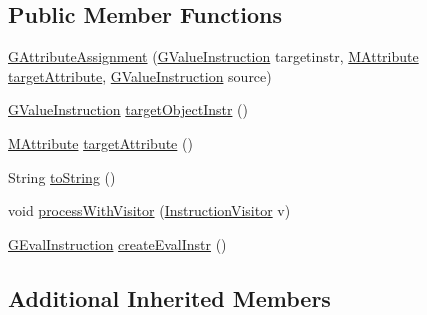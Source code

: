 \subsection*{Public Member Functions}
\begin{DoxyCompactItemize}
\item 
\hyperlink{classorg_1_1tzi_1_1use_1_1gen_1_1assl_1_1statics_1_1_g_attribute_assignment_af81b170b85bd59f32500a83f395dd5cf}{G\-Attribute\-Assignment} (\hyperlink{interfaceorg_1_1tzi_1_1use_1_1gen_1_1assl_1_1statics_1_1_g_value_instruction}{G\-Value\-Instruction} targetinstr, \hyperlink{classorg_1_1tzi_1_1use_1_1uml_1_1mm_1_1_m_attribute}{M\-Attribute} \hyperlink{classorg_1_1tzi_1_1use_1_1gen_1_1assl_1_1statics_1_1_g_attribute_assignment_a2c3601f48ed773af5e5dc784cab00e0d}{target\-Attribute}, \hyperlink{interfaceorg_1_1tzi_1_1use_1_1gen_1_1assl_1_1statics_1_1_g_value_instruction}{G\-Value\-Instruction} source)
\item 
\hyperlink{interfaceorg_1_1tzi_1_1use_1_1gen_1_1assl_1_1statics_1_1_g_value_instruction}{G\-Value\-Instruction} \hyperlink{classorg_1_1tzi_1_1use_1_1gen_1_1assl_1_1statics_1_1_g_attribute_assignment_a350fb36906ded66a424c569299337af2}{target\-Object\-Instr} ()
\item 
\hyperlink{classorg_1_1tzi_1_1use_1_1uml_1_1mm_1_1_m_attribute}{M\-Attribute} \hyperlink{classorg_1_1tzi_1_1use_1_1gen_1_1assl_1_1statics_1_1_g_attribute_assignment_a2c3601f48ed773af5e5dc784cab00e0d}{target\-Attribute} ()
\item 
String \hyperlink{classorg_1_1tzi_1_1use_1_1gen_1_1assl_1_1statics_1_1_g_attribute_assignment_a8e6a30e16d280678f7d9a2ca7ef3a792}{to\-String} ()
\item 
void \hyperlink{classorg_1_1tzi_1_1use_1_1gen_1_1assl_1_1statics_1_1_g_attribute_assignment_aee514cc0be9d5f8bdb897717dfab77ae}{process\-With\-Visitor} (\hyperlink{interfaceorg_1_1tzi_1_1use_1_1gen_1_1assl_1_1statics_1_1_instruction_visitor}{Instruction\-Visitor} v)
\item 
\hyperlink{classorg_1_1tzi_1_1use_1_1gen_1_1assl_1_1dynamics_1_1_g_eval_instruction}{G\-Eval\-Instruction} \hyperlink{classorg_1_1tzi_1_1use_1_1gen_1_1assl_1_1statics_1_1_g_attribute_assignment_a0866c761dbf83421cf17bdad3745c881}{create\-Eval\-Instr} ()
\end{DoxyCompactItemize}
\subsection*{Additional Inherited Members}


